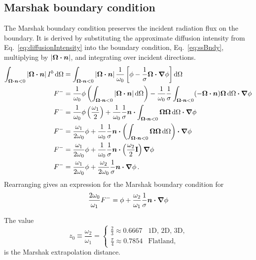 \subsection{Marshak boundary condition}
The Marshak boundary condition \cite{Mar1947} preserves the incident radiation
flux on the boundary. It is derived by substituting the approximate diffusion
intensity from Eq.~\eqref{eq:diffusionIntensity} into the boundary condition,
Eq.~\eqref{eq:ssBndy}, multiplying by $\left| \bm{\Omega}\bm{\cdot} \bm{n} \right|$, and integrating over
incident directions.
\begin{align*}
\int_{\bm{\Omega}\bm{\cdot} \bm{n} < 0 } \left| \bm{\Omega}\bm{\cdot} \bm{n} \right|
I^b \mathop{}\!\mathrm{d}\Omega
 &= 
\int_{\bm{\Omega}\bm{\cdot} \bm{n} < 0 } \left| \bm{\Omega}\bm{\cdot} \bm{n} \right| 
 \frac{1}{\omega_0} \left[ \phi - \frac{1}{\sigma}
  \bm{\Omega} \bm{\cdot} \bm{\nabla} \phi \right]
  \mathop{}\!\mathrm{d}\Omega
\\
F^{-}
&= 
\frac{1}{\omega_0} \phi \left( \int_{\bm{\Omega}\bm{\cdot} \bm{n} < 0 }
\left| \bm{\Omega}\bm{\cdot} \bm{n} \right| \mathop{}\!\mathrm{d}\Omega \right) 
  - \frac{1}{\omega_0}\frac{1}{\sigma}
  \int_{\bm{\Omega}\bm{\cdot} \bm{n} < 0 } (-\bm{\Omega}\bm{\cdot} \bm{n})
  \bm{\Omega} \mathop{}\!\mathrm{d}\Omega  \bm{\cdot} \bm{\nabla} \phi
\\
F^{-}
&=
\frac{1}{\omega_0} \phi \left( \frac{\omega_1}{2} \right) 
  + \frac{1}{\omega_0}\frac{1}{\sigma} \bm{n} \bm{\cdot}
  \int_{\bm{\Omega}\bm{\cdot} \bm{n} < 0 } \bm{\Omega} \bm{\Omega} \mathop{}\!\mathrm{d}\Omega
  \bm{\cdot} \bm{\nabla} \phi
\\
F^{-}
&=
\frac{\omega_1}{2\omega_0} \phi 
  + \frac{1}{\omega_0}\frac{1}{\sigma} \bm{n} \bm{\cdot}
  \left( \int_{\bm{\Omega}\bm{\cdot} \bm{n} < 0 } \bm{\Omega} \bm{\Omega} \mathop{}\!\mathrm{d}\Omega \right)
  \bm{\cdot} \bm{\nabla} \phi
\\
F^{-}
&=
\frac{\omega_1}{2\omega_0} \phi
+ \frac{1}{\omega_0}\frac{1}{\sigma} \bm{n} \bm{\cdot} \left( \frac{\omega_2}{2}
\mathbf{I} \right) \bm{\nabla} \phi
\\
F^{-}
&=
\frac{\omega_1}{2\omega_0} \phi
+ \frac{\omega_2}{2\omega_0}\frac{1}{\sigma} \bm{n} \bm{\cdot} \bm{\nabla} \phi\,.
\end{align*}
Rearranging gives an expression for the Marshak boundary condition for 
\begin{equation} \label{eq:marshak}
\frac{2\omega_0}{\omega_1} F^{-}
=
\phi + \frac{\omega_2}{\omega_1}\frac{1}{\sigma} \bm{n} \bm{\cdot} \bm{\nabla} \phi
\end{equation}

The value
\begin{equation*}
  z_0 \equiv \frac{\omega_2}{\omega_1}
  =
  \begin{cases}
    \frac{2}{3} \approx 0.6667 & \text{1D, 2D, 3D,} \\
    \frac{\pi}{4} \approx 0.7854 & \text{Flatland,}
  \end{cases}
\end{equation*}
is the Marshak extrapolation distance.

